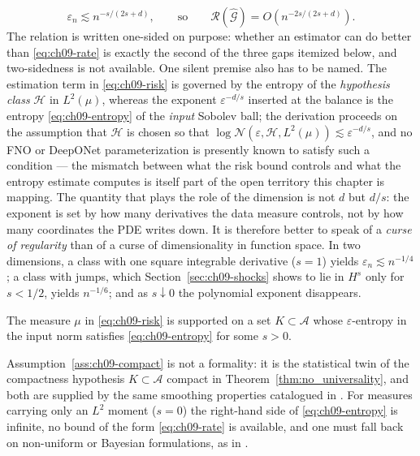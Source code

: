 \begin{equation}
  \varepsilon_n \lesssim n^{-s/(2s+d)},
  \qquad\text{so}\qquad
  \mathcal{R}(\hat{\mathcal{G}}) = O\!\left(n^{-2s/(2s+d)}\right).
  \label{eq:ch09-rate}
\end{equation}
The relation is written one-sided on purpose: whether an estimator can do
better than \eqref{eq:ch09-rate} is exactly the second of the three gaps itemized
below, and two-sidedness
is not available. One silent premise also has to be named. The estimation term
in \eqref{eq:ch09-risk} is governed by the entropy of the \emph{hypothesis
class} $\mathcal{H}$ in $L^{2}(\mu)$, whereas the exponent $\varepsilon^{-d/s}$
inserted at the balance is the entropy \eqref{eq:ch09-entropy} of the
\emph{input} Sobolev ball; the derivation proceeds on the assumption that
$\mathcal{H}$ is chosen so that
$\log\mathcal{N}(\varepsilon,\mathcal{H},L^{2}(\mu)) \lesssim \varepsilon^{-d/s}$,
and no FNO or DeepONet parameterization is presently known to satisfy such a
condition --- the mismatch between what the risk bound controls and what the
entropy estimate computes is itself part of the open territory this chapter is
mapping.
The quantity that plays the role of the dimension is not $d$ but $d/s$: the
exponent is set by how many derivatives the data measure controls, not by how
many coordinates the PDE writes down. It is therefore better to speak
of a \emph{curse of regularity} than of a curse of dimensionality in function
space. In two dimensions, a class with one square
integrable derivative ($s=1$) yields $\varepsilon_n \lesssim n^{-1/4}$; a class with
jumps, which Section~\ref{sec:ch09-shocks} shows to lie in $H^s$ only for
$s<1/2$, yields $n^{-1/6}$; and as $s\downarrow 0$ the polynomial exponent
disappears.

\begin{assumption}
\label{ass:ch09-compact}
The measure $\mu$ in \eqref{eq:ch09-risk} is supported on a set $K\subset
\mathcal{A}$ whose $\varepsilon$-entropy in the input norm satisfies
\eqref{eq:ch09-entropy} for some $s>0$.
\end{assumption}
Assumption~\ref{ass:ch09-compact} is not a formality: it is the statistical twin
of the compactness hypothesis $K\subset\mathcal{A}$ compact in
Theorem~\ref{thm:no_universality}, and both are supplied by the same smoothing
properties catalogued in .
For measures carrying only an $L^2$ moment ($s=0$) the right-hand side of
\eqref{eq:ch09-entropy} is infinite, no bound of the form \eqref{eq:ch09-rate}
is available, and one must fall back on non-uniform or Bayesian formulations, as
in \cite{stuart2010inverse}.

